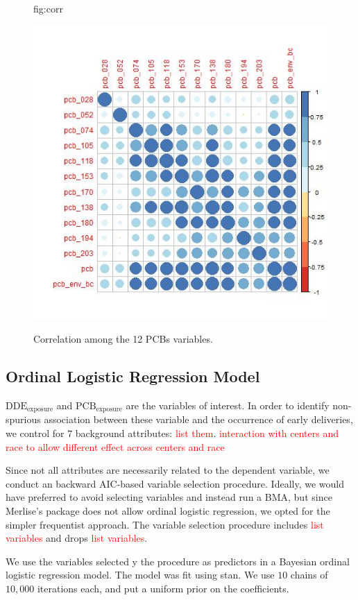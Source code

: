 \documentclass[wcp]{jmlr}%
\newcommand\todo[1]{\textcolor{red}{#1}}
\begin{document}
\begin{figure}[htbp]
	\floatconts
	{fig:corr}
	{\caption{Correlation among the 12 PCBs variables.}}
	{\includegraphics[width=0.8\linewidth]{pcb_corr}}
\end{figure}

\subsection{Ordinal Logistic Regression Model}
$\text{DDE}_{\text{exposure}}$ and $\text{PCB}_{\text{exposure}}$ are the variables of interest. In order to identify non-spurious association between these variable and the occurrence of early deliveries, we control for $7$ background attributes: \todo{list them}.
\todo{interaction with centers and race to allow different effect across centers and race}

Since not all attributes are necessarily related to the dependent variable, we conduct an backward AIC-based variable selection procedure. Ideally, we would have preferred to avoid selecting variables and instead run a BMA, but since Merlise's package does not allow ordinal logistic regression, we opted for the simpler frequentist approach. The variable selection procedure includes \todo{list variables} and drops \todo{list variables}.

We use the variables selected y the procedure as predictors in a Bayesian ordinal logistic regression model. The model was fit using stan. We use $10$ chains of $10,000$ iterations each, and put a uniform prior on the coefficients.
\end{document}
